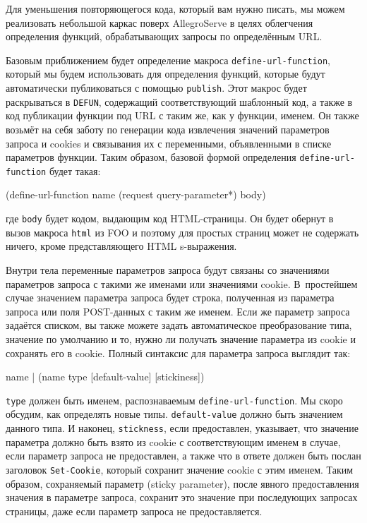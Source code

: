 Для уменьшения повторяющегося кода, который вам нужно писать, мы можем реализовать
небольшой каркас поверх AllegroServe в целях облегчения определения функций,
обрабатывающих запросы по определённым URL.

Базовым приближением будет определение макроса \lstinline{define-url-function}, который мы будем
использовать для определения функций, которые будут автоматически публиковаться с помощью
\lstinline{publish}. Этот макрос будет раскрываться в \lstinline{DEFUN}, содержащий
соответствующий шаблонный код, а также в код публикации функции под URL с таким же, как у
функции, именем. Он также возьмёт на себя заботу по генерации кода извлечения значений
параметров запроса и cookies и связывания их с переменными, объявленными в списке
параметров функции. Таким образом, базовой формой определения \lstinline{define-url-function}
будет такая:

\begin{myverb}
(define-url-function name (request query-parameter*)
  body)
\end{myverb}

\noindent{}где \lstinline{body} будет кодом, выдающим код HTML-страницы. Он будет обернут в вызов макроса
\lstinline{html} из FOO и поэтому для простых страниц может не содержать ничего, кроме
представляющего HTML s-выражения.

Внутри тела переменные параметров запроса будут связаны со значениями параметров запроса с
такими же именами или значениями cookie. В~простейшем случае значением параметра запроса
будет строка, полученная из параметра запроса или поля POST-данных с таким же именем. Если
же параметр запроса задаётся списком, вы также можете задать автоматическое преобразование
типа, значение по умолчанию и то, нужно ли получать значение параметра из cookie и сохранять его
в cookie. Полный синтаксис для параметра запроса выглядит так:

\begin{myverb}
name | (name type [default-value] [stickiness])
\end{myverb}

\lstinline{type} должен быть именем, распознаваемым \lstinline{define-url-function}. Мы скоро
обсудим, как определять новые типы. \lstinline{default-value} должно быть значением данного
типа. И наконец, \lstinline{stickness}, если предоставлен, указывает, что значение параметра
должно быть взято из cookie с соответствующим именем в случае, если параметр запроса не
предоставлен, а также что в ответе должен быть послан заголовок \lstinline{Set-Cookie}, который
сохранит значение cookie с этим именем. Таким образом, сохраняемый параметр (sticky
parameter), после явного предоставления значения в параметре запроса, сохранит это
значение при последующих запросах страницы, даже если параметр запроса не предоставляется.

